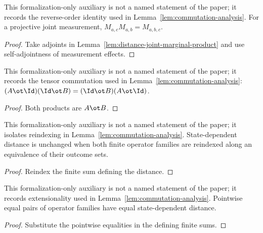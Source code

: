\begin{lemma}
	\label{lem:distance-joint-marginal-product-rev}
	\leanok
	This formalization-only auxiliary is not a named statement of the paper; it
	records the reverse-order identity used in
	Lemma~\ref{lem:commutation-analysis}. For a projective joint measurement,
	$M_{a,c}M_{a,b}=M_{a,b,c}$.
\end{lemma}
\begin{proof}
	\leanok
	Take adjoints in Lemma~\ref{lem:distance-joint-marginal-product} and use
	self-adjointness of measurement effects.
\end{proof}

\begin{lemma}
	\label{lem:distance-opposite-placements-commute}
	\leanok
	This formalization-only auxiliary is not a named statement of the paper; it
	records the tensor commutation used in
	Lemma~\ref{lem:commutation-analysis}:
	$(A\ot\Id)(\Id\ot B)=(\Id\ot B)(A\ot\Id)$.
\end{lemma}
\begin{proof}
	\leanok
	Both products are $A\ot B$.
\end{proof}

\begin{lemma}
	\label{lem:distance-reindex}
	\leanok
	This formalization-only auxiliary is not a named statement of the paper; it
	isolates reindexing in Lemma~\ref{lem:commutation-analysis}. State-dependent
	distance is unchanged when both finite operator families are reindexed along
	an equivalence of their outcome sets.
\end{lemma}
\begin{proof}
	\leanok
	Reindex the finite sum defining the distance.
\end{proof}

\begin{lemma}
	\label{lem:distance-congr}
	\leanok
	This formalization-only auxiliary is not a named statement of the paper; it
	records extensionality used in Lemma~\ref{lem:commutation-analysis}.
	Pointwise equal pairs of operator families have equal state-dependent
	distance.
\end{lemma}
\begin{proof}
	\leanok
	Substitute the pointwise equalities in the defining finite sums.
\end{proof}

